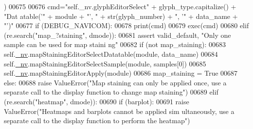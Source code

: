 \begin{DoxyCode}
{      })
00675 
00676                 cmd=\textcolor{stringliteral}{"self.\_nv.glyphEditorSelect"} + glyph\_type.capitalize() + \textcolor{stringliteral}{"Dat
      atable('"} + module +  \textcolor{stringliteral}{"', "} + str(glyph\_number) + \textcolor{stringliteral}{", '"} + data\_name + \textcolor{stringliteral}{"')"}
00677                 \textcolor{keywordflow}{if} (DEBUG\_NAVICOM):
00678                     \textcolor{keywordflow}{print}(cmd)
00679                 exec(cmd)
00680             \textcolor{keywordflow}{elif} (re.search(\textcolor{stringliteral}{"map\_?staining"}, dmode)):
00681                 \textcolor{keyword}{assert} valid\_default, \textcolor{stringliteral}{"Only one sample can be used for map staini
      ng"}
00682                 \textcolor{keywordflow}{if} (\textcolor{keywordflow}{not} map\_staining):
00683                     self.\hyperlink{classnavicom_1_1navicom_1_1NaviCom_afff3fd56fa16a68bab52ba8d801e325a}{_nv}.mapStainingEditorSelectDatatable(module, data\_name)
00684                     self.\hyperlink{classnavicom_1_1navicom_1_1NaviCom_afff3fd56fa16a68bab52ba8d801e325a}{_nv}.mapStainingEditorSelectSample(module, samples[0])
00685                     self.\hyperlink{classnavicom_1_1navicom_1_1NaviCom_afff3fd56fa16a68bab52ba8d801e325a}{_nv}.mapStainingEditorApply(module)
00686                     map\_staining = \textcolor{keyword}{True}
00687                 \textcolor{keywordflow}{else}:
00688                     \textcolor{keywordflow}{raise} ValueError(\textcolor{stringliteral}{"Map staining can only be applied once, use 
      a separate call to the display function to change map staining"})
00689             \textcolor{keywordflow}{elif} (re.search(\textcolor{stringliteral}{"heatmap"}, dmode)):
00690                 \textcolor{keywordflow}{if} (barplot):
00691                     \textcolor{keywordflow}{raise} ValueError(\textcolor{stringliteral}{"Heatmaps and barplots cannot be applied sim
      ultaneously, use a separate call to the display function to perform the heatmap"})
      

\end{DoxyCode}
